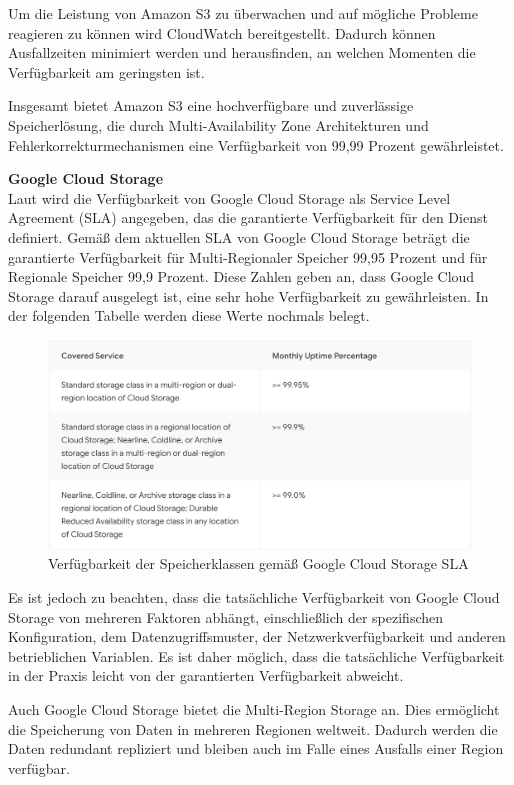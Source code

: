 Um die Leistung von Amazon S3 zu überwachen und auf mögliche Probleme reagieren zu können wird CloudWatch bereitgestellt. Dadurch können Ausfallzeiten minimiert werden und herausfinden, an welchen Momenten die Verfügbarkeit am geringsten ist.

Insgesamt bietet Amazon S3 eine hochverfügbare und zuverlässige Speicherlösung, die durch Multi-Availability Zone Architekturen und Fehlerkorrekturmechanismen eine Verfügbarkeit von 99,99 Prozent gewährleistet.

\newpage

\textbf{Google Cloud Storage}\\

Laut \cite{gcp-sla} wird die Verfügbarkeit von Google Cloud Storage als Service Level Agreement (SLA) angegeben, das die garantierte Verfügbarkeit für den Dienst definiert. Gemäß dem aktuellen SLA von Google Cloud Storage beträgt die garantierte Verfügbarkeit für Multi-Regionaler Speicher 99,95 Prozent und für Regionale Speicher 99,9 Prozent. Diese Zahlen geben an, dass Google Cloud Storage darauf ausgelegt ist, eine sehr hohe Verfügbarkeit zu gewährleisten. In der folgenden Tabelle werden diese Werte nochmals belegt.

\begin{figure}[h]
	\centering
	\includegraphics[width=12cm,keepaspectratio]{Pictures/GCSLA.png}
	\caption{Verfügbarkeit der Speicherklassen gemäß Google Cloud Storage SLA  }
\end{figure}

Es ist jedoch zu beachten, dass die tatsächliche Verfügbarkeit von Google Cloud Storage von mehreren Faktoren abhängt, einschließlich der spezifischen Konfiguration, dem Datenzugriffsmuster, der Netzwerkverfügbarkeit und anderen betrieblichen Variablen. Es ist daher möglich, dass die tatsächliche Verfügbarkeit in der Praxis leicht von der garantierten Verfügbarkeit abweicht.

Auch Google Cloud Storage bietet die Multi-Region Storage an. Dies ermöglicht die Speicherung von Daten in mehreren Regionen weltweit. Dadurch werden die Daten redundant repliziert und bleiben auch im Falle eines Ausfalls einer Region verfügbar.\\ 

